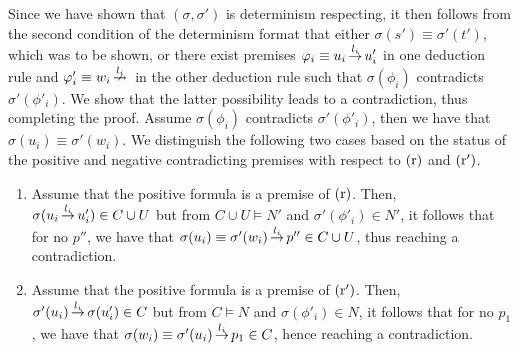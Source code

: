 Since we have shown that $(\sigma, \sigma')$ is determinism respecting,
it then follows from the second condition of the determinism format that either $\sigma(s') \equiv \sigma'(t')$,
which was to be shown, or
there exist premises $\varphi_i \equiv u_i \,{\stackrel{{l_i}}{\rightarrow}}\, u'_i$  in one deduction rule and
$\varphi'_i \equiv w_i \,{\stackrel{{l_i}}{\nrightarrow}}\,$ in the other deduction rule such that
$\sigma(\phi_i)$ contradicts $\sigma'(\phi'_i)$.
We show that the latter possibility leads to a contradiction, thus completing the proof.
Assume $\sigma(\phi_i)$ contradicts $\sigma'(\phi'_i)$, then we have that $\sigma(u_i) \equiv \sigma'(w_i)$.
We distinguish the following two cases based on the status of the positive and negative contradicting 
premises with respect to $\mathrm{(r)}$ and $\mathrm{(r')}$.

\begin{enumerate}
\item
Assume that the positive formula is a premise of $\mathrm{(r)}$.
Then, $\sigma(u_i \,{\stackrel{{l_i}}{\rightarrow}}\, u'_i) \in C \cup U$ but  from $C \cup U \vDash N'$ and $\sigma'(\phi'_i) \in N'$, it follows that
for no $p''$, we have that $\sigma(u_i) \equiv \sigma'(w_i) \,{\stackrel{{l_i}}{\rightarrow}}\, p'' \in C \cup U$, thus reaching a contradiction.

\item
Assume that the positive formula is a premise of $\mathrm{(r')}$.
Then, $\sigma'(u_i) \,{\stackrel{{l_i}}{\rightarrow}}\, \sigma(u'_i) \in C$ but from $C \vDash N$ and $\sigma(\phi'_i) \in N$, it follows that
for no $p_1$, we have that $\sigma(w_i) \equiv \sigma'(u_i) \,{\stackrel{{l_i}}{\rightarrow}}\, p_1 \in C$, hence reaching a contradiction. \qedhere
\end{enumerate}